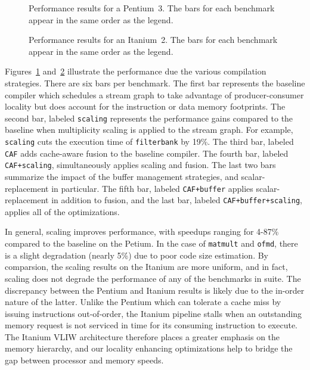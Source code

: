 \begin{figure}[t]
  \vspace{-24pt}
  \hspace{-0.3in}
  \vspace{-48pt}
  \caption{Performance results for a Pentium~3.  The bars for each
  benchmark appear in the same order as the legend.}
  \label{fig:results-p3}
  \vspace{-6pt}
\end{figure}

\begin{figure}[t]
  \vspace{-36pt}
  \hspace{-0.3in}
  \vspace{-48pt}
  \caption{Performance results for an Itanium~2.  The bars for each
  benchmark appear in the same order as the legend.}
  \label{fig:results-ipf}
  \vspace{-12pt}
\end{figure}

Figures~\ref{fig:results-p3} and~\ref{fig:results-ipf} illustrate the
performance due the various compilation strategies. There are six bars
per benchmark. The first bar represents the baseline compiler which
schedules a stream graph to take advantage of producer-consumer
locality but does account for the instruction or data memory
footprints. The second bar, labeled {\tt scaling} represents the
performance gains compared to the baseline when multiplicity scaling
is applied to the stream graph. For example, {\tt scaling} cuts the
execution time of \texttt{filterbank} by 19\%. The third bar, labeled
{\tt CAF} adds cache-aware fusion to the baseline compiler. The fourth
bar, labeled \texttt{CAF+scaling}, simultaneously applies scaling and
fusion. The last two bars summarize the impact of the buffer
management strategies, and scalar-replacement in particular. 
The fifth bar, labeled \texttt{CAF+buffer}
applies scalar-replacement in addition to fusion, and the last bar,
labeled \texttt{CAF+buffer+scaling}, applies all of the optimizations.

In general, scaling improves performance, with speedups ranging for
4-87\% compared to the baseline on the Petium. In the case of
\texttt{matmult} and \texttt{ofmd}, there is a slight degradation
(nearly 5\%) due to poor code size estimation. By comparsion, the
scaling results on the 
Itanium are more uniform, and in fact, scaling does not degrade the
performance of any of the benchmarks in suite. The discrepancy between
the Pentium and Itanium results is likely due to the in-order
nature of the latter. Unlike the Pentium which can tolerate a cache
miss by issuing instructions out-of-order, the Itanium pipeline stalls
when an outstanding memory request is not serviced in time for
its consuming instruction to execute. The Itanium VLIW architecture
therefore places a greater emphasis on the memory hierarchy, and our
locality enhancing optimizations help to bridge the gap between
processor and memory speeds.

